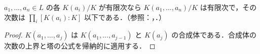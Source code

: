 \begin{prop}[有限生成部分体の有限性]
$a_1,\ldots,a_n\in L$ の各 $K(a_i)/K$ が有限次なら $K(a_1,\ldots,a_n)/K$ は有限次で，その次数は $\prod_i[K(a_i):K]$ 以下である．（参照：，．）
\end{prop}
\begin{proof}
$K(a_1,\ldots,a_j)$ は $K(a_1,\ldots,a_{j-1})$ と $K(a_j)$ の合成体である．合成体の次数の上界と塔の公式を帰納的に適用する．
\end{proof}
